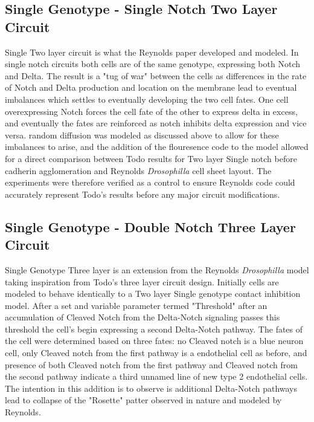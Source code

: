 \subsection{Single Genotype - Single Notch Two Layer Circuit}

Single Two layer circuit is what the Reynolds paper developed and modeled. In single notch circuits both cells are of the same genotype, expressing both Notch and Delta. The result is a "tug of war" between the cells as differences in the rate of Notch and Delta production and location on the membrane lead to eventual imbalances which settles to eventually developing the two cell fates. One cell overexpressing Notch forces the cell fate of the other to express delta in excess, and eventually the fates are reinforced as notch inhibits delta expression and vice versa. random diffusion was modeled as discussed above to allow for these imbalances to arise, and the addition of the flouresence code to the model allowed for a direct comparison between Todo results for Two layer Single notch before cadherin agglomeration and Reynolds \emph{Drosophilla} cell sheet layout. The experiments were therefore verified as a control to ensure Reynolds code could accurately represent Todo's results before any major circuit modifications.

\subsection{Single Genotype - Double Notch Three Layer Circuit}

Single Genotype Three layer is an extension from the Reynolds \emph{Drosophilla} model taking inspiration from Todo's three layer circuit design. Initially cells are modeled to behave identically to a Two layer Single genotype contact inhibition model. After a set and variable parameter termed "Threshold" after an accumulation of Cleaved Notch from the Delta-Notch signaling passes this threshold the cell's begin expressing a second Delta-Notch pathway. The fates of the cell were determined based on three fates: no Cleaved notch is a blue neuron cell, only Cleaved notch from the first pathway is a endothelial cell as before, and presence of both Cleaved notch from the first pathway and Cleaved notch from the second pathway indicate a third unnamed line of new type 2 endothelial cells. The intention in this addition is to observe is additional Delta-Notch pathways lead to collapse of the "Rosette" patter observed in nature and modeled by Reynolds.








